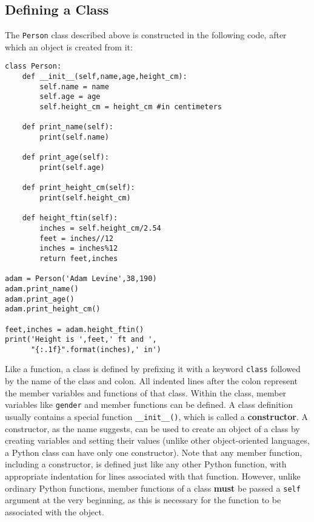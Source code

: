 \documentclass[12pt]{article}
\newcommand{\code}{\texttt}
\begin{document}
\subsection{Defining a Class}
The \code{Person} class described above is constructed in the following code, after which an object is created from it:

\begin{lstlisting}[frame=single] 
class Person:   
    def __init__(self,name,age,height_cm):
        self.name = name
        self.age = age
        self.height_cm = height_cm #in centimeters
    
    def print_name(self):
        print(self.name)
    
    def print_age(self):
        print(self.age)
    
    def print_height_cm(self):
        print(self.height_cm)
    
    def height_ftin(self):
        inches = self.height_cm/2.54
        feet = inches//12
        inches = inches%12
        return feet,inches

adam = Person('Adam Levine',38,190)
adam.print_name()
adam.print_age()
adam.print_height_cm()

feet,inches = adam.height_ftin()
print('Height is ',feet,' ft and ',
      "{:.1f}".format(inches),' in')
\end{lstlisting}

Like a function, a class is defined by prefixing it with a keyword \code{class} followed by the name of the class and colon. All indented lines after the colon represent the member variables and functions of that class. Within the class, member variables like \code{gender} and member functions can be defined. A class definition usually contains a special function \code{\_\_init\_\_()}, which is called a \textbf{constructor}. A constructor, as the name suggests, can be used to create an object of a class by creating variables and setting their values (unlike other object-oriented languages, a Python class can have only one constructor). Note that any member function, including a constructor, is defined just like any other Python function, with appropriate indentation for lines associated with that function. However, unlike ordinary Python functions, member functions of a class \textbf{must} be passed a \code{self} argument at the very beginning, as this is necessary for the function to be associated with the object.
\end{document}
